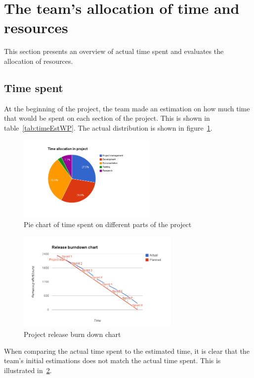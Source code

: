 \section{The team's allocation of time and resources}
\label{sec:timeSpent}
This section presents an overview of actual time spent and evaluates the allocation of resources.

\subsection{Time spent}
At the beginning of the project, the team made an estimation on how much time that would be spent on each section of the project. This is shown in table~\ref{tab:timeEstWP}. The actual distribution is shown in figure~\ref{fig:piechart}.

\begin{figure}[H]
\centering
\includegraphics[width=0.6\textwidth, clip, trim=4cm 2cm 4cm 1cm]{ch/retrospect/fig/timePie.png}
\caption{Pie chart of time spent on different parts of the project}
\label{fig:piechart}
\end{figure}

\begin{figure}[H]
\centering
\includegraphics[width=0.7\textwidth, clip, trim=1.1cm 0.5cm 1.2cm 1cm]{ch/retrospect/fig/release.png}
\caption{Project release burn down chart}
\label{fig:release}
\end{figure}

When comparing the actual time spent to the estimated time, it is clear that the team's initial estimations does not match the actual time spent. This is illustrated in~\ref{fig:release}.

